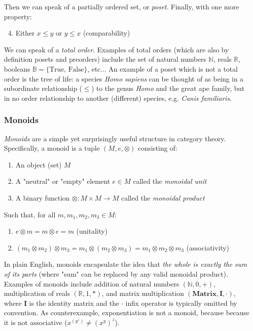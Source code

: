 \documentclass[12pt,a4paper]{article}
\begin{document}
Then we can speak of a partially ordered set, or \textit{poset}. Finally, with one more property:

\begin{enumerate}
\setcounter{enumi}{3}
\item Either $x \leq y$ or $y \leq x$ (comparability)
\end{enumerate}

We can speak of a \textit{total order}. Examples of total orders (which are also by definition posets and preorders) include the set of natural numbers $\mathbb{N}$, reals $\mathbb{R}$, booleans $\mathbb{B} = \{ \text{True, False} \}$, etc... An example of a poset which is not a total order is the tree of life: a species \textit{Homo sapiens} can be thought of as being in a subordinate relationship ($\leq$) to the genus \textit{Homo} and the great ape family, but in no order relationship to another (different) species, e.g. \textit{Canis familiaris}.

\subsubsection{Monoids}

\textit{Monoids} are a simple yet surprisingly useful structure in category theory. Specifically, a monoid is a tuple $(M, e, \otimes)$ consisting of:

\begin{enumerate}
\item An object (set) $M$
\item A "neutral" or "empty" element $e \in M$ called the \textit{monoidal unit}
\item A binary function $\otimes: M \times M \to M$ called the \textit{monoidal product}
\end{enumerate}

Such that, for all $m, m_1, m_2, m_3 \in M$: 

\begin{enumerate}
\renewcommand{\theenumi}{\alph{enumi}}
\item $e \otimes m = m \otimes e = m$ (unitality)
\item $(m_1 \otimes m_2) \otimes m_3 = m_1 \otimes (m_2 \otimes m_3) = m_1 \otimes m_2 \otimes m_3$ (associativity)
\end{enumerate}

In plain English, monoids encapsulate the idea that \textit{the whole is exactly the sum of its parts} (where "sum" can be replaced by any valid monoidal product). Examples of monoids include addition of natural numbers $(\mathbb{N}, 0, +)$, multiplication of reals $(\mathbb{R}, 1, *)$, and matrix multiplication $(\mathbf{Matrix}, \mathbf{I}, \cdot)$, where $\mathbf{I}$ is the identity matrix and the $\cdot$ infix operator is typically omitted by convention. As counterexample, exponentiation is not a monoid, because because it is not associative ($x^{(y^z)} \neq (x^y)^z$). 
\end{document}

